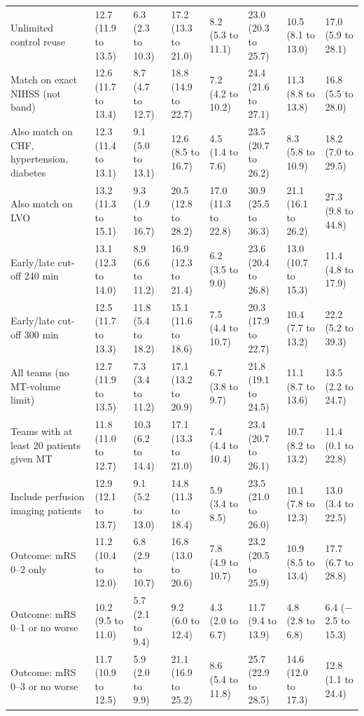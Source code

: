 \begin{landscape}
{\begin{longtable}[]{@{}llllllll@{}}
Unlimited control reuse & 12.7 (11.9 to 13.5) & 6.3 (2.3 to 10.3) & 17.2 (13.3 to 21.0) & 8.2 (5.3 to 11.1) & 23.0 (20.3 to 25.7) & 10.5 (8.1 to 13.0) & 17.0 (5.9 to 28.1) \\
Match on exact NIHSS (not band) & 12.6 (11.7 to 13.4) & 8.7 (4.7 to 12.7) & 18.8 (14.9 to 22.7) & 7.2 (4.2 to 10.2) & 24.4 (21.6 to 27.1) & 11.3 (8.8 to 13.8) & 16.8 (5.5 to 28.0) \\
Also match on CHF, hypertension, diabetes & 12.3 (11.4 to 13.1) & 9.1 (5.0 to 13.1) & 12.6 (8.5 to 16.7) & 4.5 (1.4 to 7.6) & 23.5 (20.7 to 26.2) & 8.3 (5.8 to 10.9) & 18.2 (7.0 to 29.5) \\
Also match on LVO & 13.2 (11.3 to 15.1) & 9.3 (1.9 to 16.7) & 20.5 (12.8 to 28.2) & 17.0 (11.3 to 22.8) & 30.9 (25.5 to 36.3) & 21.1 (16.1 to 26.2) & 27.3 (9.8 to 44.8) \\
Early/late cut-off 240 min & 13.1 (12.3 to 14.0) & 8.9 (6.6 to 11.2) & 16.9 (12.3 to 21.4) & 6.2 (3.5 to 9.0) & 23.6 (20.4 to 26.8) & 13.0 (10.7 to 15.3) & 11.4 (4.8 to 17.9) \\
Early/late cut-off 300 min & 12.5 (11.7 to 13.3) & 11.8 (5.4 to 18.2) & 15.1 (11.6 to 18.6) & 7.5 (4.4 to 10.7) & 20.3 (17.9 to 22.7) & 10.4 (7.7 to 13.2) & 22.2 (5.2 to 39.3) \\
All teams (no MT-volume limit) & 12.7 (11.9 to 13.5) & 7.3 (3.4 to 11.2) & 17.1 (13.2 to 20.9) & 6.7 (3.8 to 9.7) & 21.8 (19.1 to 24.5) & 11.1 (8.7 to 13.6) & 13.5 (2.2 to 24.7) \\
Teams with at least 20 patients given MT & 11.8 (11.0 to 12.7) & 10.3 (6.2 to 14.4) & 17.1 (13.3 to 21.0) & 7.4 (4.4 to 10.4) & 23.4 (20.7 to 26.1) & 10.7 (8.2 to 13.2) & 11.4 (0.1 to 22.8) \\
Include perfusion imaging patients & 12.9 (12.1 to 13.7) & 9.1 (5.2 to 13.0) & 14.8 (11.3 to 18.4) & 5.9 (3.4 to 8.5) & 23.5 (21.0 to 26.0) & 10.1 (7.8 to 12.3) & 13.0 (3.4 to 22.5) \\
Outcome: mRS 0--2 only & 11.2 (10.4 to 12.0) & 6.8 (2.9 to 10.7) & 16.8 (13.0 to 20.6) & 7.8 (4.9 to 10.7) & 23.2 (20.5 to 25.9) & 10.9 (8.5 to 13.4) & 17.7 (6.7 to 28.8) \\
Outcome: mRS 0--1 or no worse & 10.2 (9.5 to 11.0) & 5.7 (2.1 to 9.4) & 9.2 (6.0 to 12.4) & 4.3 (2.0 to 6.7) & 11.7 (9.4 to 13.9) & 4.8 (2.8 to 6.8) & 6.4 ($-$2.5 to 15.3) \\
Outcome: mRS 0--3 or no worse & 11.7 (10.9 to 12.5) & 5.9 (2.0 to 9.9) & 21.1 (16.9 to 25.2) & 8.6 (5.4 to 11.8) & 25.7 (22.9 to 28.5) & 14.6 (12.0 to 17.3) & 12.8 (1.1 to 24.4) \\
\end{longtable}
}
\end{landscape}

